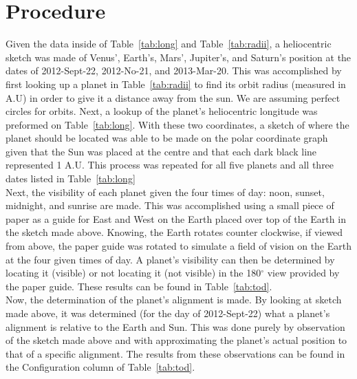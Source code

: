 \documentclass{article}
\begin{document}

\section{Procedure}

Given the data inside of Table~\ref{tab:long} and Table~\ref{tab:radii}, a heliocentric sketch was made of Venus', Earth's, Mars', 
Jupiter's, and Saturn's position at the dates of 2012-Sept-22, 2012-No-21, and 2013-Mar-20. This was accomplished by first
looking up a planet in Table~\ref{tab:radii} to find its orbit radius (measured in A.U) in order to give it a distance away from the
sun. We are assuming perfect circles for orbits. Next, a lookup of the planet's heliocentric longitude was preformed on 
Table~\ref{tab:long}. With these two coordinates, a sketch of where the planet should be located was able to be made on the 
polar coordinate graph given that the Sun was placed at the centre and that each dark black line represented 1 A.U. This process
was repeated for all five planets and all three dates listed in Table~\ref{tab:long}\\

Next, the visibility of each planet given the four times of day: noon, sunset, midnight, and sunrise are made. This was accomplished
using a small piece of paper as a guide for East and West on the Earth placed over top of the Earth in the sketch made above. Knowing,
the Earth rotates counter clockwise, if viewed from above, the paper guide was rotated to simulate a field of vision on the Earth at
the four given times of day. A planet's visibility can then be determined by locating it (visible) or not locating it (not visible) in the
180$^\circ$ view provided by the paper guide. These results can be found in Table~\ref{tab:tod}.\\

Now, the determination of the planet's alignment is made. By looking at sketch made above, it was determined (for the day of
2012-Sept-22) what a planet's alignment is relative to the Earth and Sun. This was done purely by observation of the sketch
made above and with 
approximating the planet's actual position to that of a specific alignment. The results from these observations can be found
in the Configuration column of Table~\ref{tab:tod}.\\
\end{document}
